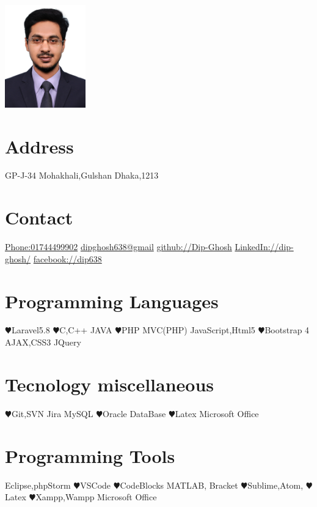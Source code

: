 \documentclass[]{cv-style}
\begin{document}
\begin{aside}
\section{} 
\includegraphics[width=3.5cm]{Dip.jpg}
\section{Address}
    GP-J-34
    Mohakhali,Gulshan
    Dhaka,1213
\section{Contact}
\href{Phone:+8801744499902}{Phone:01744499902}
\href{mail:dipghosh638@gmail.com}{dipghosh638@gmail}
\href{Github:https://github.com/Dip-Ghosh}{github://Dip-Ghosh}
\href{LinkedIn:https://www.linkedin.com/in/dip-ghosh-54b5aba3/}{LinkedIn://dip-ghosh/}
\href{http://facebook.com/dip638}{facebook://dip638}
\section{Programming
   Languages}
{\color{red} $\varheartsuit$}Laravel5.8
 {\color{red} $\varheartsuit$}C,C++
 JAVA
{\color{red} $\varheartsuit$}PHP
MVC(PHP)
JavaScript,Html5
 {\color{red} $\varheartsuit$}Bootstrap 4
AJAX,CSS3
JQuery
~
\section{Tecnology miscellaneous }
 {\color{red} $\varheartsuit$}Git,SVN
 Jira
 MySQL
 {\color{red} $\varheartsuit$}Oracle DataBase
  {\color{red} $\varheartsuit$}Latex
 Microsoft Office
\section{Programming Tools}
    Eclipse,phpStorm
    {\color{red} $\varheartsuit$}VSCode
    {\color{red} $\varheartsuit$}CodeBlocks
   MATLAB, Bracket
   {\color{red} $\varheartsuit$}Sublime,Atom,
   {\color{red} $\varheartsuit$} Latex
    {\color{red} $\varheartsuit$}Xampp,Wampp
    Microsoft Office
\end{aside}
\end{document}

